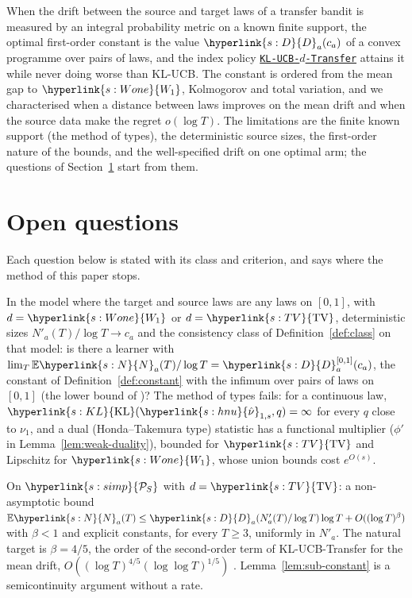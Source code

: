 \documentclass[11pt]{article}
\newcommand{\E}{\mathbb{E}}
\newcommand{\sy}[2]{{\hyperlink{#1}{#2}}}
\newcommand{\Simp}{\sy{s:simp}{\mathcal{P}_{S}}}
\newcommand{\KL}{\sy{s:KL}{\mathrm{KL}}}
\newcommand{\TV}{\sy{s:TV}{\mathrm{TV}}}
\newcommand{\Wone}{\sy{s:Wone}{W_{1}}}
\newcommand{\Nc}{\sy{s:N}{N}}
\newcommand{\hnu}{\sy{s:hnu}{\hat\nu}}
\newcommand{\Dc}{\sy{s:D}{D}}
\newcommand{\Alg}{\hyperref[alg:index]{\texttt{KL-UCB-$d$-Transfer}}}
\begin{document}
When the drift between the source and target laws of a transfer bandit is measured by an integral
probability metric on a known finite support, the optimal first-order constant is the value
$\Dc_a(c_a)$ of a convex programme over pairs of laws, and the index policy \Alg{} attains it while
never doing worse than KL-UCB. The constant is ordered from the mean gap to $\Wone$, Kolmogorov and
total variation, and we characterised when a distance between laws improves on the mean drift and
when the source data make the regret $o(\log T)$. The limitations are the finite known support (the
method of types), the deterministic source sizes, the first-order nature of the bounds, and the
well-specified drift on one optimal arm; the questions of Section~\ref{sec:open} start from them.

\section{Open questions}\label{sec:open}

Each question below is stated with its class and criterion, and says where the method of this paper
stops.

\begin{openquestion}\label{oq:nonparametric}
In the model where the target and source laws are any laws on $[0,1]$, with $d=\Wone$ or $d=\TV$,
deterministic sizes $N'_a(T)/\log T\to c_a$ and the consistency class of Definition~\ref{def:class}
on that model: is there a learner with $\lim_T\E \Nc_a(T)/\log T=\Dc^{[0,1]}_a(c_a)$, the constant of
Definition~\ref{def:constant} with the infimum over pairs of laws on $[0,1]$ (the lower bound of
\citealp[Theorem~3]{PMM25})? The method of types fails: for a continuous law,
$\KL(\hnu_{1,s},q)=\infty$ for every $q$ close to $\nu_1$, and a dual (Honda--Takemura type)
statistic has a functional multiplier ($\phi'$ in Lemma~\ref{lem:weak-duality}), bounded for $\TV$
and Lipschitz for $\Wone$, whose union bounds cost $e^{O(s)}$.
\end{openquestion}

\begin{openquestion}\label{oq:second-order}
On $\Simp$ with $d=\TV$: a non-asymptotic bound
$\E \Nc_a(T)\le \Dc_a(N'_a(T)/\log T)\log T+O((\log T)^{\beta})$ with $\beta<1$ and explicit constants,
for every $T\ge3$, uniformly in $N'_a$. The natural target is $\beta=4/5$, the order of the
second-order term of KL-UCB-Transfer for the mean drift, $O((\log T)^{4/5}(\log\log T)^{1/5})$
\citep[Theorem~3]{PMRM26}. Lemma~\ref{lem:sub-constant} is a semicontinuity argument without a rate.
\end{openquestion}
\end{document}
